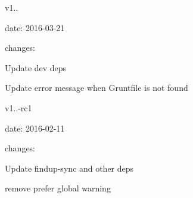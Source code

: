 v1..
\begin{DoxyItemize}
\item date\+: 2016-\/03-\/21
\item changes\+:
\begin{DoxyItemize}
\item Update dev deps
\item Update error message when Gruntfile is not found
\end{DoxyItemize}
\end{DoxyItemize}

v1..-\/rc1
\begin{DoxyItemize}
\item date\+: 2016-\/02-\/11
\item changes\+:
\begin{DoxyItemize}
\item Update findup-\/sync and other deps
\item remove prefer global warning 
\end{DoxyItemize}
\end{DoxyItemize}